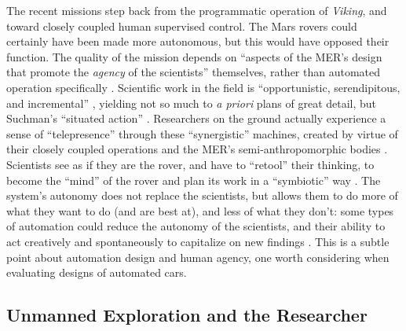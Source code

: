 The recent missions step back
from the programmatic operation of \emph{Viking}, and toward closely coupled human
supervised control. The Mars rovers could
certainly have been made more autonomous, but this would have opposed
their function. The quality of the mission depends on ``aspects of the
MER's design that promote the \emph{agency} of the scientists''
themselves, rather than automated operation specifically \cite[p.
  xii]{clancey}. Scientific work in the field is ``opportunistic, 
serendipitous, and incremental'' \cite[p. 32]{clancey}, yielding
not so much to \emph{a priori}
plans of great detail, but Suchman's ``situated
action'' \cite{suchmanSA}. Researchers on the ground actually
experience a sense of ``telepresence'' through these ``synergistic''
machines, created 
by virtue of their closely coupled operations and the MER's
semi-anthropomorphic bodies \cite[p. 55]{clancey}. Scientists see
as if they are the rover, and have to ``retool'' their thinking, to
become the ``mind'' of the rover and plan its work in a ``symbiotic''
way \cite[p. 106, 110, 118]{clancey}. The system's autonomy does not replace the
scientists, but allows them to do more of what they want to do (and are
best at), and less of what they don't: some types of automation could reduce the
autonomy of the scientists, and their ability to act creatively and
spontaneously to capitalize on new findings \cite[p.
  118-119]{clancey}. This is a subtle point about automation design
and human agency, one
worth considering when evaluating designs of automated cars.

\subsection{Unmanned Exploration and the Researcher}

